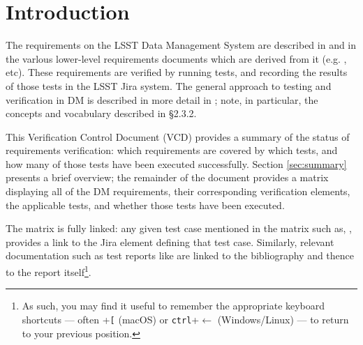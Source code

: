 
\section{Introduction}
\label{sec:intro}

The requirements on the LSST Data Management System are described in  and in the varlous lower-level requirements documents which are derived from it (e.g. , etc).
These requirements are verified by running tests, and recording the results of those tests in the LSST Jira system.
The general approach to testing and verification in DM is described in more detail in ; note, in particular, the concepts and vocabulary described in  \S2.3.2.

This Verification Control Document (VCD) provides a summary of the status of requirements verification: which requirements are covered by which tests, and how many of those tests have been executed successfully.
Section \ref{sec:summary} presents a brief overview; the remainder of the document provides a matrix displaying all of the DM requirements, their corresponding verification elements, the applicable tests, and whether those tests have been executed.

The matrix is fully linked: any given test case mentioned in the matrix such as, , provides a link to the Jira element defining that test case.
Similarly, relevant documentation such as test reports like  are linked to the bibliography and thence to the report itself\footnote{As such, you may find it useful to remember the appropriate keyboard shortcuts --- often \cmdkey{}+\texttt{[} (macOS) or \texttt{ctrl}+{$\leftarrow$ (Windows/Linux}) --- to return to your previous position.}.
